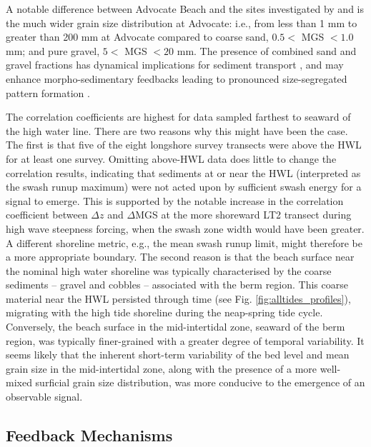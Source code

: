 \documentclass[preprint,12pt,authoryear]{elsarticle}
\begin{document}
A notable difference between Advocate Beach and the sites investigated by \citet{Masselink_etal2007} and \citet{Austin_Buscombe2008} is the much wider grain size distribution at Advocate: i.e., from less than 1 mm to greater than 200 mm at Advocate compared to coarse sand, $0.5 <$ MGS $< 1.0$ mm; and pure gravel, $5 <$ MGS $< 20$ mm. The presence of combined sand and gravel fractions has dynamical implications for sediment transport \citep[e.g.,][]{Wilcock_McArdell1993, Wilcock_McArdell1997, Wilcock_Crowe2003}, and may enhance morpho-sedimentary feedbacks leading to pronounced size-segregated pattern formation \citep[e.g.,][]{LonguetHiggins_Parkin1962, Guest_Hay2019}. 

The correlation coefficients are highest for data sampled farthest to seaward of the high water line. There are two reasons why this might have been the case. The first is that five of the eight longshore survey transects were above the HWL for at least one survey. Omitting above-HWL data does little to change the correlation results, indicating that sediments at or near the HWL (interpreted as the swash runup maximum) were not acted upon by sufficient swash energy for a signal to emerge. This is supported by the notable increase in the correlation coefficient between $\Delta z$ and $\Delta$MGS at the more shoreward LT2 transect during high wave steepness forcing, when the swash zone width would have been greater. A different shoreline metric, e.g., the mean swash runup limit, might therefore be a more appropriate boundary. The second reason is that the beach surface near the nominal high water shoreline was typically characterised by the coarse sediments -- gravel and cobbles -- associated with the berm region. This coarse material near the HWL persisted through time (see Fig. \ref{fig:alltides_profiles}), migrating with the high tide shoreline during the neap-spring tide cycle. Conversely, the beach surface in the mid-intertidal zone, seaward of the berm region, was typically finer-grained with a greater degree of temporal variability. It seems likely that the inherent short-term variability of the bed level and mean grain size in the mid-intertidal zone, along with the presence of a more well-mixed surficial grain size distribution, was more conducive to the emergence of an observable signal.


\subsection{Feedback Mechanisms}\label{Discussion:Feedback}
\end{document}
